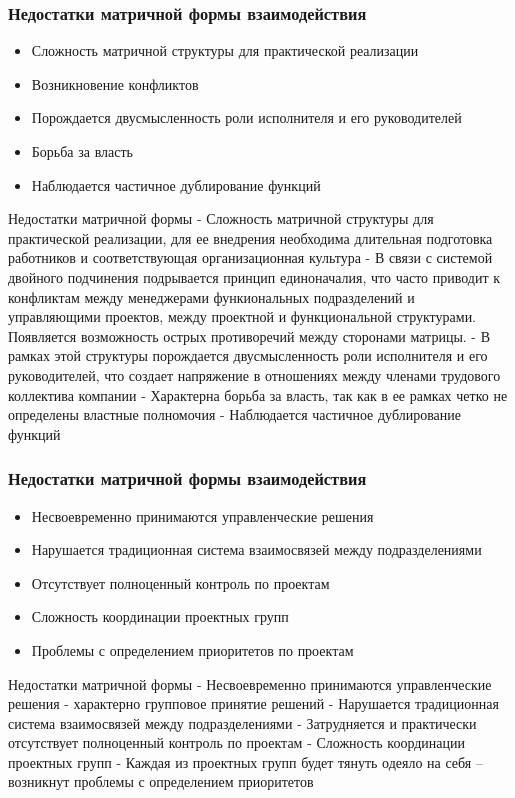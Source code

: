 \documentclass{../industrial-development}
\begin{document}
\begin{frame} \frametitle{Недостатки матричной формы взаимодействия}
  
  \begin{itemize}
  \item Сложность матричной структуры для практической реализации
  \item Возникновение конфликтов
  \item Порождается двусмысленность роли исполнителя и его руководителей
  \item Борьба за власть
  \item Наблюдается частичное дублирование функций
\end{itemize}
\end{frame}

\lecturenotes
Недостатки матричной формы
- Сложность матричной структуры для практической реализации, для ее внедрения необходима длительная подготовка работников и соответствующая организационная культура
- В связи с системой двойного подчинения подрывается принцип единоначалия, что часто приводит к конфликтам между менеджерами функиональных подразделений и управляющими проектов, между проектной и функциональной структурами. Появляется возможность острых противоречий между сторонами матрицы.
- В рамках этой структуры порождается двусмысленность роли исполнителя и его руководителей, что создает напряжение в отношениях между членами трудового коллектива компании
- Характерна борьба за власть, так как в ее рамках четко не определены властные полномочия
- Наблюдается частичное дублирование функций

\begin{frame} \frametitle{Недостатки матричной формы взаимодействия}
\begin{itemize}
  \item Несвоевременно принимаются управленческие решения
  \item Нарушается традиционная система взаимосвязей между подразделениями
  \item Отсутствует полноценный контроль по проектам
  \item Сложность координации проектных групп
  \item Проблемы  с определением приоритетов по проектам
  \end{itemize}
\end{frame}

\lecturenotes
Недостатки матричной формы
- Несвоевременно принимаются управленческие решения - характерно групповое принятие решений
- Нарушается традиционная система взаимосвязей между подразделениями
- Затрудняется и практически отсутствует полноценный контроль по проектам
- Сложность координации проектных групп
- Каждая из проектных групп будет тянуть одеяло на себя – возникнут проблемы  с определением приоритетов
\end{document}
